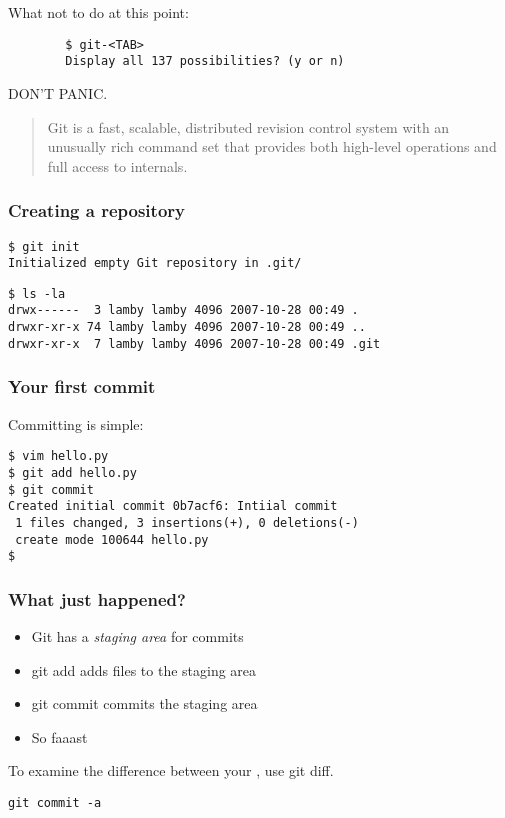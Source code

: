 \documentclass{beamer}
\begin{document}
\begin{frame}[fragile]
    What not to do at this point:

    \begin{verbatim}
        $ git-<TAB>
        Display all 137 possibilities? (y or n)
    \end{verbatim}

    DON'T PANIC.

    \begin{quote}
    Git is a fast, scalable, distributed revision control system with an
    unusually \alert{rich command set that provides both high-level operations and
    full access to internals}.
    \end{quote}

\end{frame}

\begin{frame}[fragile]
    \frametitle{Creating a repository}

    \begin{verbatim}
$ git init
Initialized empty Git repository in .git/
    \end{verbatim}

    \begin{verbatim}
$ ls -la
drwx------  3 lamby lamby 4096 2007-10-28 00:49 .
drwxr-xr-x 74 lamby lamby 4096 2007-10-28 00:49 ..
drwxr-xr-x  7 lamby lamby 4096 2007-10-28 00:49 .git
    \end{verbatim}
\end{frame}

\begin{frame}[fragile]
    \frametitle{Your first commit}

    Committing is simple:

    \begin{verbatim}
$ vim hello.py
$ git add hello.py
$ git commit
Created initial commit 0b7acf6: Intiial commit
 1 files changed, 3 insertions(+), 0 deletions(-)
 create mode 100644 hello.py
$
    \end{verbatim}

\end{frame}

\begin{frame}[fragile]
    \frametitle{What just happened?}

    \begin{itemize}
        \item Git has a \emph{staging area} for commits
        \item \alert{git add} adds files to the staging area
        \item \alert{git commit} commits the staging area
        \item So faaast
    \end{itemize}

\begin{example}
    To examine the difference between your , use \alert{git diff}.

    \verb#git commit -a#
\end{example}

\end{frame}
\end{document}

